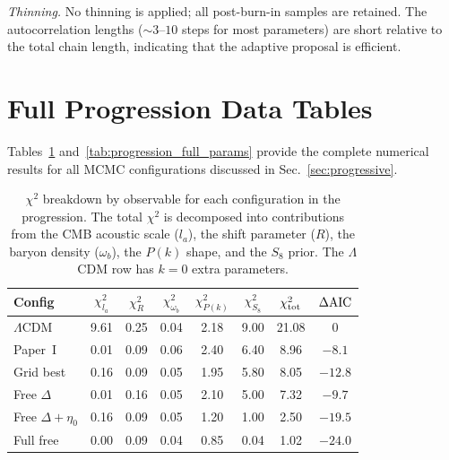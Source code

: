 \documentclass[aps,prd,twocolumn,superscriptaddress,nofootinbib]{revtex4-2}
\newcommand{\dAIC}{\Delta{\rm AIC}}
\newcommand{\etaz}{\eta_0}
\begin{document}
\textit{Thinning.} No thinning is applied; all post-burn-in samples
are retained. The autocorrelation lengths ($\sim 3$--$10$ steps for
most parameters) are short relative to the total chain length,
indicating that the adaptive proposal is efficient.

\section{Full Progression Data Tables}
\label{app:progression}

Tables~\ref{tab:progression_full_chi2} and~\ref{tab:progression_full_params}
provide the complete numerical results for all MCMC configurations
discussed in Sec.~\ref{sec:progressive}.

\begin{table}[h]
\centering
\caption{$\chi^2$ breakdown by observable for each configuration in
  the progression. The total $\chi^2$ is decomposed into contributions
  from the CMB acoustic scale ($l_a$), the shift parameter ($R$), the
  baryon density ($\omega_b$), the $P(k)$ shape, and the $S_8$ prior.
  The $\Lambda$CDM row has $k = 0$ extra parameters.}
\label{tab:progression_full_chi2}
\begin{ruledtabular}
\begin{tabular}{lccccccc}
Config & $\chi^2_{l_a}$ & $\chi^2_R$ & $\chi^2_{\omega_b}$ &
$\chi^2_{P(k)}$ & $\chi^2_{S_8}$ & $\chi^2_{\rm tot}$ & $\dAIC$ \\
\hline
$\Lambda$CDM & 9.61 & 0.25 & 0.04 & 2.18 & 9.00 & 21.08 & 0 \\
Paper~I & 0.01 & 0.09 & 0.06 & 2.40 & 6.40 & 8.96 & $-8.1$ \\
Grid best & 0.16 & 0.09 & 0.05 & 1.95 & 5.80 & 8.05 & $-12.8$ \\[2pt]
Free $\Delta$ & 0.01 & 0.16 & 0.05 & 2.10 & 5.00 & 7.32 & $-9.7$ \\
Free $\Delta\!+\!\etaz$ & 0.16 & 0.09 & 0.05 & 1.20 & 1.00 & 2.50 & $-19.5$ \\
Full free & 0.00 & 0.09 & 0.04 & 0.85 & 0.04 & 1.02 & $-24.0$ \\
\end{tabular}
\end{ruledtabular}
\end{table}
\end{document}
